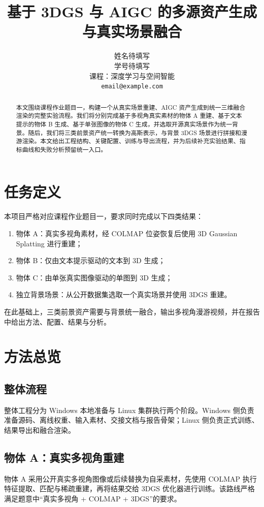 \documentclass{article}
\title{基于 3DGS 与 AIGC 的多源资产生成与真实场景融合}
\author{%
  姓名待填写 \\
  学号待填写 \\
  课程：深度学习与空间智能 \\
  \texttt{email@example.com}
}
\begin{document}
\maketitle

\begin{abstract}
本文围绕课程作业题目一，构建一个从真实场景重建、AIGC 资产生成到统一三维融合渲染的完整实验流程。我们将分别完成基于多视角真实素材的物体 A 重建、基于文本提示的物体 B 生成、基于单张图像的物体 C 生成，并选取开源真实场景作为统一背景。随后，我们将三类前景资产统一转换为高斯表示，与背景 3DGS 场景进行拼接和漫游渲染。本文给出工程结构、关键配置、训练与导出流程，并为后续补充实验结果、指标曲线和失败分析预留统一入口。
\end{abstract}

\section{任务定义}
本项目严格对应课程作业题目一，要求同时完成以下四类结果：
\begin{enumerate}
  \item 物体 A：真实多视角素材，经 COLMAP 位姿恢复后使用 3D Gaussian Splatting 进行重建；
  \item 物体 B：仅由文本提示驱动的文本到 3D 生成；
  \item 物体 C：由单张真实图像驱动的单图到 3D 生成；
  \item 独立背景场景：从公开数据集选取一个真实场景并使用 3DGS 重建。
\end{enumerate}
在此基础上，三类前景资产需要与背景统一融合，输出多视角漫游视频，并在报告中给出方法、配置、结果与分析。

\section{方法总览}
\subsection{整体流程}
整体工程分为 Windows 本地准备与 Linux 集群执行两个阶段。Windows 侧负责准备源码、离线权重、输入素材、交接文档与报告骨架；Linux 侧负责正式训练、结果导出和融合渲染。

\subsection{物体 A：真实多视角重建}
物体 A 采用公开真实多视角图像或后续替换为自采素材，先使用 COLMAP 执行特征提取、匹配与稀疏重建，再将结果交给 3DGS 优化器进行训练。该路线严格满足题意中“真实多视角 + COLMAP + 3DGS”的要求。
\end{document}
